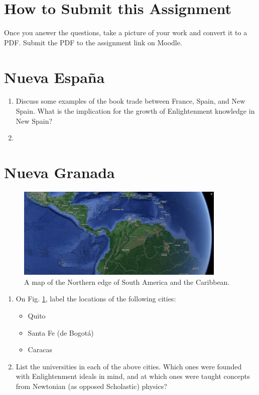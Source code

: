 \documentclass[10pt]{article}
\begin{document}
\maketitle

\section{How to Submit this Assignment}

Once you answer the questions, take a picture of your work and convert it to a PDF.  Submit the PDF to the assignment link on Moodle.

\section{Nueva Espa\~{n}a}

\begin{enumerate}
\item Discuss some examples of the book trade between France, Spain, and New Spain.  What is the implication for the growth of Enlightenment knowledge in New Spain? \\ \vspace{1cm}
\item 
\end{enumerate}

\section{Nueva Granada}

\begin{figure}[ht]
\centering
\includegraphics[width=10cm]{nueva_granada.png}
\caption{\label{fig:ng} A map of the Northern edge of South America and the Caribbean.}
\end{figure}

\begin{enumerate}
\item On Fig. \ref{fig:ng}, label the locations of the following cities:
\begin{itemize}
\item Quito
\item Santa Fe (de Bogot\'{a})
\item Caracas
\end{itemize}
\item List the universities in each of the above cities.  Which ones were founded with Enlightenment ideals in mind, and at which ones were taught concepts from Newtonian (as opposed Scholastic) physics? \\ \vspace{2cm}
\end{enumerate}
\end{document}
